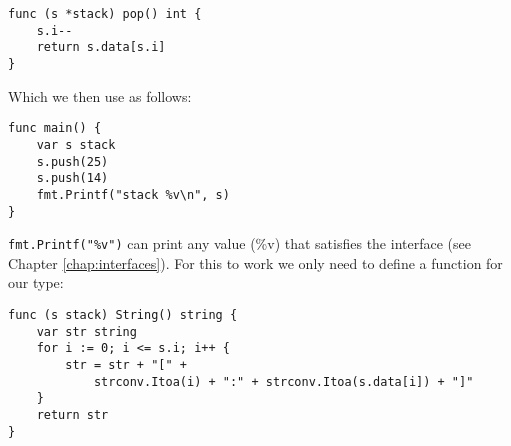 \begin{Answer}
\begin{lstlisting}
func (s *stack) pop() int {
	s.i--
	return s.data[s.i]
}
\end{lstlisting}
Which we then use as follows:
\begin{lstlisting}
func main() {
	var s stack
	s.push(25)
	s.push(14)
	fmt.Printf("stack %v\n", s)
}
\end{lstlisting}

\Question \lstinline{fmt.Printf("%v")} can
print any value (\%v) that satisfies the  interface
(see Chapter \ref{chap:interfaces}).
For this to work we only need to define a  function for
our type:
\begin{lstlisting}[]
func (s stack) String() string {
	var str string
	for i := 0; i <= s.i; i++ {
		str = str + "[" +
			strconv.Itoa(i) + ":" + strconv.Itoa(s.data[i]) + "]"
	}
	return str
}
\end{lstlisting}
\end{Answer}
